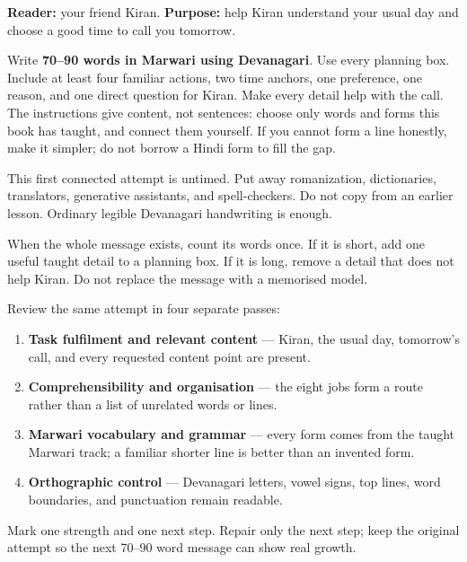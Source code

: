 \textbf{Reader:} your friend Kiran. \textbf{Purpose:} help Kiran understand your usual day and choose a good time to call you tomorrow.

Write \textbf{70–90 words in Marwari using Devanagari}. Use every planning box. Include at least four familiar actions, two time anchors, one preference, one reason, and one direct question for Kiran. Make every detail help with the call. The instructions give content, not sentences: choose only words and forms this book has taught, and connect them yourself. If you cannot form a line honestly, make it simpler; do not borrow a Hindi form to fill the gap.

This first connected attempt is untimed. Put away romanization, dictionaries, translators, generative assistants, and spell-checkers. Do not copy from an earlier lesson. Ordinary legible Devanagari handwriting is enough.

When the whole message exists, count its words once. If it is short, add one useful taught detail to a planning box. If it is long, remove a detail that does not help Kiran. Do not replace the message with a memorised model.

\begin{tcolorbox}[breakable,colback=teal!4,colframe=teal!35!black,title={Before you move on}]
Review the same attempt in four separate passes:

\begin{enumerate}
\raggedright
  \item \textbf{Task fulfilment and relevant content} — Kiran, the usual day, tomorrow's call, and every requested content point are present.
  \item \textbf{Comprehensibility and organisation} — the eight jobs form a route rather than a list of unrelated words or lines.
  \item \textbf{Marwari vocabulary and grammar} — every form comes from the taught Marwari track; a familiar shorter line is better than an invented form.
  \item \textbf{Orthographic control} — Devanagari letters, vowel signs, top lines, word boundaries, and punctuation remain readable.
\end{enumerate}

Mark one strength and one next step. Repair only the next step; keep the original attempt so the next 70–90 word message can show real growth.
\end{tcolorbox}
